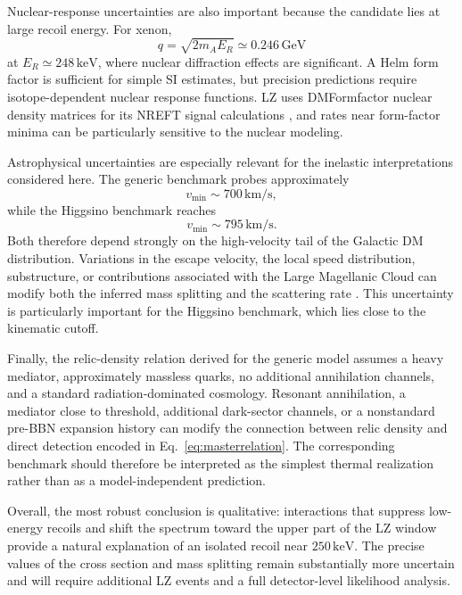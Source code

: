 \documentclass[aps,prd,reprint,superscriptaddress,nofootinbib,longbibliography,floatfix]{revtex4-2}
\newcommand{\GeV}{\mathrm{GeV}}
\newcommand{\keV}{\mathrm{keV}}
\begin{document}
Nuclear-response uncertainties are also important because the candidate lies at large recoil energy. For xenon,
\begin{equation}
q=\sqrt{2m_AE_R}\simeq0.246\,\GeV
\end{equation}
at $E_R\simeq248\,\keV$, where nuclear diffraction effects are significant. A Helm form factor is sufficient for simple SI estimates, but precision predictions require isotope-dependent nuclear response functions. LZ uses DMFormfactor nuclear density matrices for its NREFT signal calculations \cite{LZ2026Extended,Fitzpatrick2013}, and rates near form-factor minima can be particularly sensitive to the nuclear modeling.

Astrophysical uncertainties are especially relevant for the inelastic interpretations considered here. The generic benchmark probes approximately
\begin{equation}
v_{\min}\sim700\,\mathrm{km/s},
\end{equation}
while the Higgsino benchmark reaches
\begin{equation}
v_{\min}\sim795\,\mathrm{km/s}.
\end{equation}
Both therefore depend strongly on the high-velocity tail of the Galactic DM distribution. Variations in the escape velocity, the local speed distribution, substructure, or contributions associated with the Large Magellanic Cloud can modify both the inferred mass splitting and the scattering rate \cite{Baxter2021,Graham2025}. This uncertainty is particularly important for the Higgsino benchmark, which lies close to the kinematic cutoff.

Finally, the relic-density relation derived for the generic model assumes a heavy mediator, approximately massless quarks, no additional annihilation channels, and a standard radiation-dominated cosmology. Resonant annihilation, a mediator close to threshold, additional dark-sector channels, or a nonstandard pre-BBN expansion history can modify the connection between relic density and direct detection encoded in Eq.~\eqref{eq:masterrelation}. The corresponding benchmark should therefore be interpreted as the simplest thermal realization rather than as a model-independent prediction.

Overall, the most robust conclusion is qualitative: interactions that suppress low-energy recoils and shift the spectrum toward the upper part of the LZ window provide a natural explanation of an isolated recoil near $250\,\keV$. The precise values of the cross section and mass splitting remain substantially more uncertain and will require additional LZ events and a full detector-level likelihood analysis.
\end{document}
